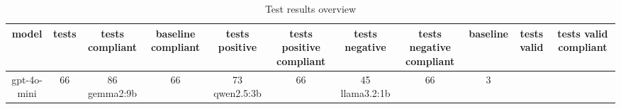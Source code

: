 
  \begin{table}[h!]
  \centering
  \begin{tabular}{|c|c|c|c|c|c|c|c|c|c|c|}
  \hline
  model & tests & tests compliant & baseline compliant & tests positive & tests positive compliant & tests negative & tests negative compliant & baseline & tests valid & tests valid compliant \\
  \hline
  gpt-4o-mini & 66 & 86%
\hline
gemma2:9b & 66 & 73%
\hline
qwen2.5:3b & 66 & 45%
\hline
llama3.2:1b & 66 & 3%
  \end{tabular}
  \caption{Test results overview}
  
  \end{table}
  